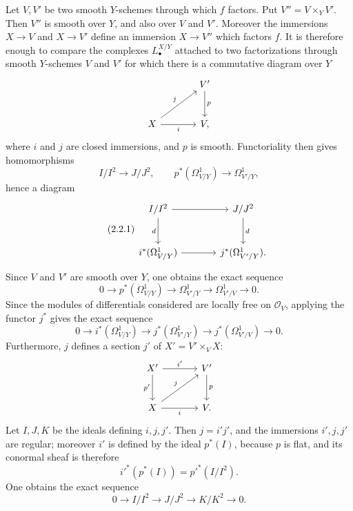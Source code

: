 Let $V,V'$ be two smooth $Y$-schemes through which $f$ factors. Put $V''=V\times_Y V'$. Then $V''$ is smooth over $Y$, and also over $V$ and $V'$. Moreover the immersions $X\to V$ and $X\to V'$ define an immersion $X\to V''$ which factors $f$. It is therefore enough to compare the complexes $L^{X/Y}_\bullet$ attached to two factorizations through smooth $Y$-schemes $V$ and $V'$ for which there is a commutative diagram over $Y$
\[
\begin{tikzcd}[column sep=large,row sep=large]
& V' \arrow[d,"p"]\\
X \arrow[ur,"j"] \arrow[r,"i"'] & V,
\end{tikzcd}
\]
where $i$ and $j$ are closed immersions, and $p$ is smooth. Functoriality then gives homomorphisms
\[
I/I^2\longrightarrow J/J^2,
\qquad
p^*(\Omega^1_{V/Y})\longrightarrow\Omega^1_{V'/Y},
\]
hence a diagram
\begin{equation}\tag{2.2.1}
\begin{tikzcd}[column sep=large,row sep=large]
I/I^2 \arrow[r] \arrow[d,"d"'] & J/J^2 \arrow[d,"d"]\\
i^*(\Omega^1_{V/Y}) \arrow[r] & j^*(\Omega^1_{V'/Y}).
\end{tikzcd}
\end{equation}
Since $V$ and $V'$ are smooth over $Y$, one obtains the exact sequence
\[
0\longrightarrow p^*(\Omega^1_{V/Y})\longrightarrow\Omega^1_{V'/Y}
\longrightarrow\Omega^1_{V'/V}\longrightarrow0.
\]
Since the modules of differentials considered are locally free on $\mathcal O_V$, applying the functor $j^*$ gives the exact sequence
\begin{equation}\tag{2.2.2}
0\longrightarrow i^*(\Omega^1_{V/Y})\longrightarrow j^*(\Omega^1_{V'/Y})
\longrightarrow j^*(\Omega^1_{V'/V})\longrightarrow0.
\end{equation}
Furthermore, $j$ defines a section $j'$ of $X'=V'\times_V X$:
\[
\begin{tikzcd}[column sep=large,row sep=large]
X' \arrow[r,"i'"] \arrow[d,"p'"'] & V' \arrow[d,"p"]\\
X \arrow[r,"i"'] \arrow[ur,"j"] & V .
\end{tikzcd}
\]
Let $I,J,K$ be the ideals defining $i,j,j'$. Then $j=i'j'$, and the immersions $i',j,j'$ are regular; moreover $i'$ is defined by the ideal $p^*(I)$, because $p$ is flat, and its conormal sheaf is therefore
\[
i'^*(p^*(I))=p'^*(I/I^2).
\]
One obtains the exact sequence
\begin{equation}\tag{2.2.3}
0\longrightarrow I/I^2\longrightarrow J/J^2\longrightarrow K/K^2\longrightarrow0.
\end{equation}
